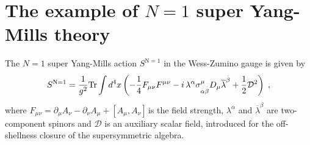 \documentclass[a4paper,12pt]{article}
\begin{document}
\section{The example of $N=1$ super Yang-Mills theory}

The $N=1$ super Yang-Mills action $S^{\mathrm{N=1}}$ in the Wess-Zumino
gauge is given by 
\begin{equation}
S^{\mathrm{N=1}}=\frac{1}{g^{2}}\mathrm{Tr}\int d^{4}x\left( -\frac{1}{4}%
F_{\mu \nu }F^{\mu \nu }-i\,\lambda ^{\alpha }\sigma _{\alpha \stackrel{.}{%
\beta }}^{\mu }D_{\mu }\overline{\lambda }^{\stackrel{.}{\beta }}+\frac{1}{2}%
\mathcal{D}^{2}\right) \;,  \label{n1ac}
\end{equation}
where $F_{\mu \nu }=\partial _{\mu }A_{\nu }-\partial _{\nu }A_{\mu }+\left[
A_{\mu },A_{\nu }\right] \,$is the field strength, $\lambda ^{\alpha }$ and $%
\overline{\lambda }^{\stackrel{.}{\beta }}$ are two-component spinors and $%
\mathcal{D}$ is an auxiliary scalar field, introduced for the off-shellness
closure of the supersymmetric algebra.
\end{document}

